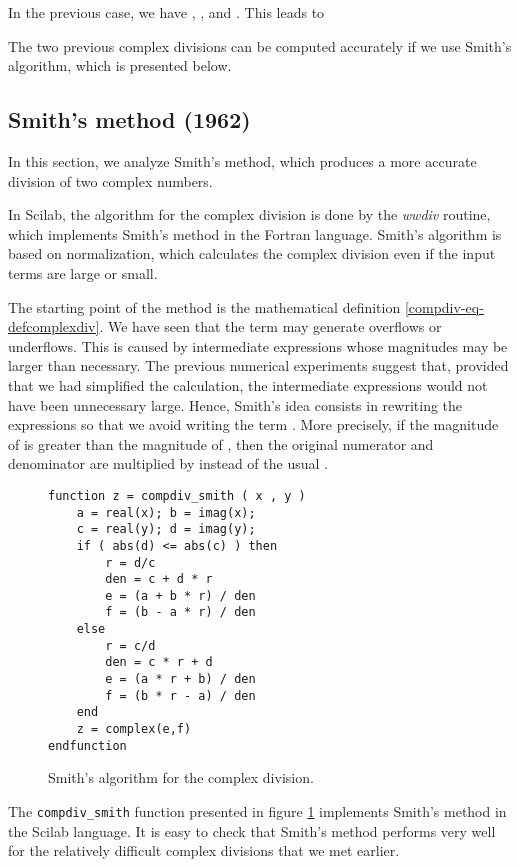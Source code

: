 \documentclass{paper}
\newcommand{\scifun}[1]{\texttt{#1}}
\begin{document}
In the previous case, we have , ,  and .
This leads to


The two previous complex divisions can be computed accurately if we use 
Smith's algorithm, which is presented below.


\subsection{Smith's method (1962)}

In this section, we analyze Smith's method, which produces a more accurate 
division of two complex numbers. 

In Scilab, the algorithm for the complex 
division is done by the \emph{wwdiv} routine, which implements  
Smith's method \cite{Smith1962} in the Fortran language.
Smith's algorithm is based on normalization, which calculates the complex 
division even if the input terms are large or small. 

The starting point of the method is the mathematical definition \ref{compdiv-eq-defcomplexdiv}.
We have seen that the term  may generate overflows or underflows.
This is caused by intermediate expressions whose magnitudes may be larger than necessary.
The previous numerical experiments suggest that, provided that we 
had simplified the calculation, the intermediate expressions 
would not have been unnecessary large. 
Hence, Smith's idea consists in rewriting the expressions 
so that we avoid writing the term .
More precisely, if the magnitude of  is greater than the magnitude of , 
then the original numerator and denominator are multiplied 
by  instead of the usual .

\begin{figure}
\caption{Smith's algorithm for the complex division.}
\label{fig-compdiv-algosmith}
\lstset{language=scilabscript}
\begin{lstlisting}
function z = compdiv_smith ( x , y )
    a = real(x); b = imag(x);
    c = real(y); d = imag(y);
    if ( abs(d) <= abs(c) ) then
        r = d/c
        den = c + d * r
        e = (a + b * r) / den
        f = (b - a * r) / den
    else
        r = c/d
        den = c * r + d
        e = (a * r + b) / den
        f = (b * r - a) / den
    end
    z = complex(e,f)
endfunction
\end{lstlisting}
\end{figure}

The \scifun{compdiv\_smith} function presented in figure \ref{fig-compdiv-algosmith} 
implements Smith's method in the Scilab language.
It is easy to check that Smith's method performs very well for the relatively 
difficult complex divisions that we met earlier. 
\end{document}

